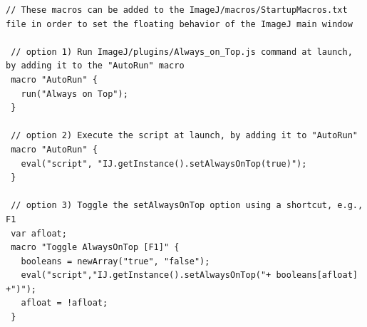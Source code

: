 \begin{lstlisting}[caption={Customizing the Float Behavior of IJ's
Main Window},label={lis:CustomizingIJFloat},showstringspaces=false,tabsize=4]
 // These macros can be added to the ImageJ/macros/StartupMacros.txt file in order to set the floating behavior of the ImageJ main window

 // option 1) Run ImageJ/plugins/Always_on_Top.js command at launch, by adding it to the "AutoRun" macro
 macro "AutoRun" {
   run("Always on Top");
 }

 // option 2) Execute the script at launch, by adding it to "AutoRun"
 macro "AutoRun" {
   eval("script", "IJ.getInstance().setAlwaysOnTop(true)");
 }

 // option 3) Toggle the setAlwaysOnTop option using a shortcut, e.g., F1
 var afloat;
 macro "Toggle AlwaysOnTop [F1]" {
   booleans = newArray("true", "false");
   eval("script","IJ.getInstance().setAlwaysOnTop("+ booleans[afloat] +")");
   afloat = !afloat;
 }
\end{lstlisting}

